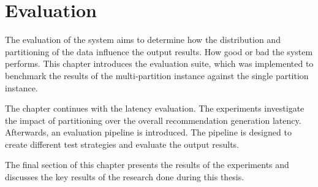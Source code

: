 \chapter{Evaluation}
\label{chap:evaluation}
The evaluation of the system aims to determine how the distribution and partitioning of the data influence the output results. How good or bad the system performs. This chapter introduces the evaluation suite, which was implemented to benchmark the results of the multi-partition instance against the single partition instance.

The chapter continues with the latency evaluation. The experiments investigate the impact of partitioning over the overall recommendation generation latency. Afterwards, an evaluation pipeline is introduced. The pipeline is designed to create different test strategies and evaluate the output results.

The final section of this chapter presents the results of the experiments and discusses the key results of the research done during this thesis.
